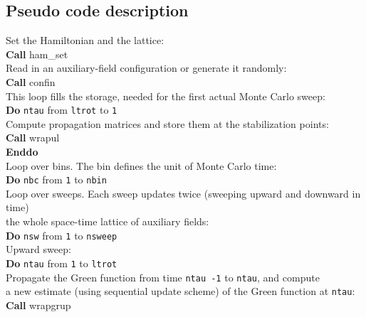 %
\subsection{Pseudo code description}\label{sec:pseudocode}
%
\begin{mdframed}[frametitle={Structure of the main program \path{Prog/main.f90} of the auxiliary field QMC implementation:}]
{\setlength{\parindent}{0pt}
Set the Hamiltonian and the lattice:\\
\textbf{Call} ham\_set\\
Read in an auxiliary-field configuration or generate it randomly:\\
\textbf{Call} confin\\

This loop fills the storage, needed for the first actual Monte Carlo sweep:\\
\textbf{Do} \texttt{ntau} from  \texttt{ltrot} to \texttt{1}\\
\hspace*{1em} Compute propagation matrices and store them at the stabilization points:\\
\hspace*{1em} \textbf{Call} wrapul\\
\textbf{Enddo}\\
 
Loop over bins. The bin defines the unit of Monte Carlo time:\\
\textbf{Do} \texttt{nbc} from  \texttt{1} to \texttt{nbin} \\
\hspace*{1em} Loop over sweeps. Each sweep updates twice (sweeping upward and downward in time)\\
\hspace*{1em} the whole space-time lattice of auxiliary fields:\\
\hspace*{1em} \textbf{Do} \texttt{nsw} from  \texttt{1} to \texttt{nsweep}  \\
\hspace*{2em} Upward sweep:\\
\hspace*{2em} \textbf{Do} \texttt{ntau} from \texttt{1} to \texttt{ltrot}\\      
\hspace*{3em} Propagate the Green function from time \texttt{ntau -1} to \texttt{ntau}, and compute\\
\hspace*{3em} a new estimate (using sequential update scheme) of the Green function at \texttt{ntau}: \\
\hspace*{3em} \textbf{Call} wrapgrup\\
         
}
\end{mdframed}
